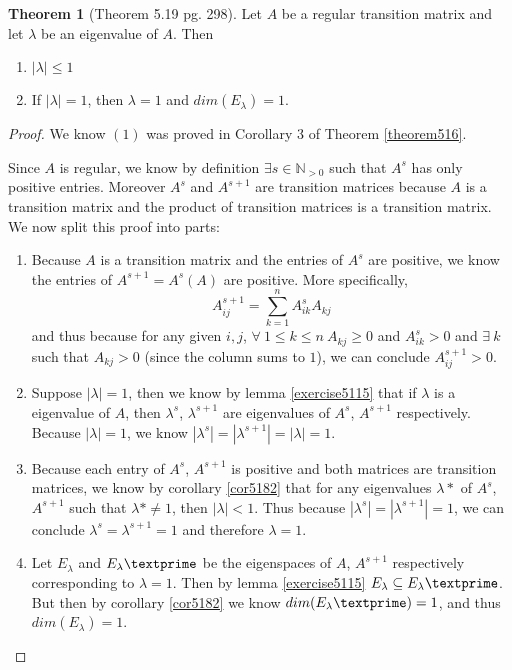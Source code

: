 \documentclass{amsart}
\theoremstyle{definition}
\newtheorem{theorem}{Theorem}
\theoremstyle{remark}
\numberwithin{equation}{section}
\begin{document}
\begin{theorem}[Theorem 5.19 pg. 298]\label{theorem519}
Let $A$ be a regular transition matrix and let $\lambda$ be an eigenvalue of $A$.  Then 

\begin{enumerate}
	\item $|\lambda| \leq 1$
	\item If $|\lambda| = 1$, then $\lambda = 1$ and $dim(E_{\lambda}) = 1$.

\end{enumerate}

\end{theorem}

\begin{proof}

We know $(1)$ was proved in Corollary 3 of Theorem \ref{theorem516}.

Since $A$ is regular, we know by definition $\exists s \in \mathbb{N}_{>0}$ such that $A^s$ has only positive entries.
Moreover $A^s$ and $A^{s+1}$ are transition matrices because $A$ is a transition matrix and the product of transition matrices is a transition matrix.
We now split this proof into parts:

\begin{enumerate}
	\item 
		Because $A$ is a transition matrix and the entries of $A^s$ are positive, we know the entries of $A^{s+1} = A^s(A)$ are positive.
		More specifically,
		$$A^{s+1}_{ij} = \sum_{k = 1}^nA^s_{ik}A_{kj}$$
		and thus because for any given $i, j$, $\forall\ 1 \leq k \leq n\ A_{kj} \geq 0$ and $A^s_{ik} > 0$ and $\exists\ k$ such that $A_{kj}  > 0$ (since the column sums to $1$), we can conclude $A^{s+1}_{ij} > 0$.

	\item 
		Suppose $|\lambda| = 1$, then we know by lemma \ref{exercise5115} that if $\lambda$ is a eigenvalue of $A$, then $\lambda^s$, $\lambda^{s+1}$ are eigenvalues of $A^s$, $A^{s+1}$ respectively.  Because $|\lambda| = 1$, we know $ |\lambda^s |= |\lambda^{s+1} |= |\lambda| = 1$.

	\item
		Because each entry of $A^s$, $A^{s+1}$ is positive and both matrices are transition matrices, we know by corollary \ref{cor5182} that for any eigenvalues $\lambda*$ of $A^s$, $A^{s+1}$ such that $\lambda* \neq 1$, then $|\lambda| < 1$.
		Thus because $|\lambda^s |= |\lambda^{s+1} |= 1 $, we can conclude $\lambda^s = \lambda^{s+1} = 1$ and therefore $\lambda = 1$.
	\item 

		Let $E_{\lambda}$ and $E_{\lambda}\textprime$ be the eigenspaces of $A$, $A^{s+1}$ respectively corresponding to $\lambda = 1$.
		Then by lemma \ref{exercise5115} $E_{\lambda} \subseteq E_{\lambda}\textprime$.
		But then by corollary \ref{cor5182} we know $dim(E_{\lambda}\textprime) = 1$, and thus $dim(E_{\lambda}) = 1$.
\end{enumerate}

\end{proof}
\end{document}
